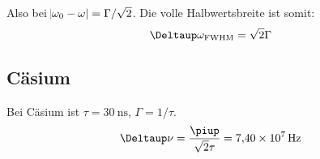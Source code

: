 Also bei $\abs{\omega_0 - \omega} = \Gamma / \sqrt 2$. Die volle Halbwertsbreite ist somit:
\[
	\Deltaup \omega_\text{FWHM} = \sqrt 2 \Gamma
\]

\subsection{Cäsium}

Bei Cäsium ist $\tau = \SI{30}{\nano\second}$, $\Gamma = 1/\tau$.
\[
	\Deltaup\nu = \frac{\piup}{\sqrt 2 \tau} = \SI{7.40e7}\hertz
\]


\IfFileExists{\bibliographyfile}{
}{}



